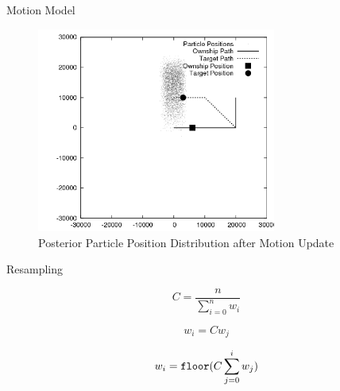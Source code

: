 \documentclass{beamer}
\begin{document}


\begin{frame}{Motion Model}

\begin{figure}
\centering
\includegraphics[width=0.7\textwidth]{data/particles_motion.png}
\caption{Posterior Particle Position Distribution after Motion Update}
\end{figure}

\end{frame}




\begin{frame}{Resampling}

\begin{equation}\label{resample1}
C = \frac{n}{\sum_{i=0}^{n} w_{i}}
\end{equation}

\begin{equation}\label{resample2}
w_{i}=C w_{j}
\end{equation}

\begin{equation}\label{resample3}
w_{i}=\verb!floor!(C\sum_{j=0}^{i} w_{j})
\end{equation}

\end{frame}


\end{document}
